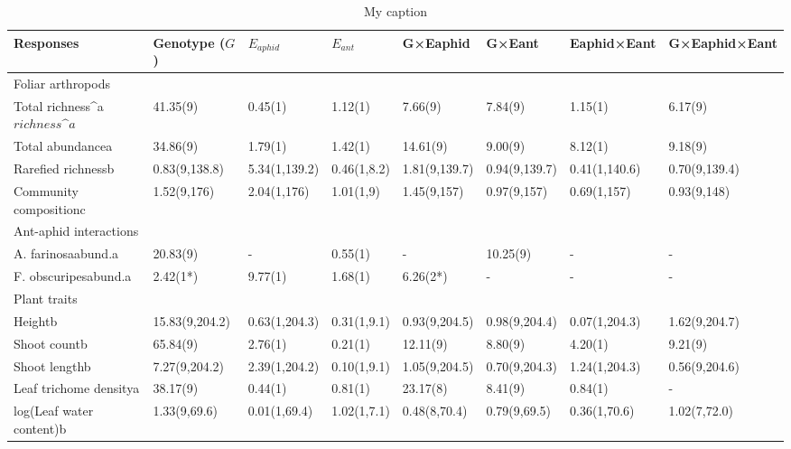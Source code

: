 \begin{table}[]
\centering
\caption{My caption}
\label{my-label}
\begin{tabular}{@{}llllllll@{}}
\toprule
Responses                & Genotype (\(G\))   & \(E_{aphid}\)        &  \(E_{ant}\)        & G×Eaphid      & G×Eant        & Eaphid×Eant   & G×Eaphid×Eant \\ \midrule
Foliar arthropods        &                &               &             &               &               &               &               \\
Total richness^a\(richness\^a\)         & 41.35(9)       & 0.45(1)       & 1.12(1)     & 7.66(9)       & 7.84(9)       & 1.15(1)       & 6.17(9)       \\
Total abundancea         & 34.86(9)       & 1.79(1)       & 1.42(1)     & 14.61(9)      & 9.00(9)       & 8.12(1)       & 9.18(9)       \\
Rarefied richnessb       & 0.83(9,138.8)  & 5.34(1,139.2) & 0.46(1,8.2) & 1.81(9,139.7) & 0.94(9,139.7) & 0.41(1,140.6) & 0.70(9,139.4) \\
Community compositionc   & 1.52(9,176)    & 2.04(1,176)   & 1.01(1,9)   & 1.45(9,157)   & 0.97(9,157)   & 0.69(1,157)   & 0.93(9,148)   \\
Ant-aphid interactions   &                &               &             &               &               &               &               \\
A. farinosaabund.a       & 20.83(9)       & -             & 0.55(1)     & -             & 10.25(9)      & -             & -             \\
F. obscuripesabund.a     & 2.42(1*)       & 9.77(1)       & 1.68(1)     & 6.26(2*)      & -             & -             & -             \\
Plant traits             &                &               &             &               &               &               &               \\
Heightb                  & 15.83(9,204.2) & 0.63(1,204.3) & 0.31(1,9.1) & 0.93(9,204.5) & 0.98(9,204.4) & 0.07(1,204.3) & 1.62(9,204.7) \\
Shoot countb             & 65.84(9)       & 2.76(1)       & 0.21(1)     & 12.11(9)      & 8.80(9)       & 4.20(1)       & 9.21(9)       \\
Shoot lengthb            & 7.27(9,204.2)  & 2.39(1,204.2) & 0.10(1,9.1) & 1.05(9,204.5) & 0.70(9,204.3) & 1.24(1,204.3) & 0.56(9,204.6) \\
Leaf trichome densitya   & 38.17(9)       & 0.44(1)       & 0.81(1)     & 23.17(8)      & 8.41(9)       & 0.84(1)       & -             \\
log(Leaf water content)b & 1.33(9,69.6)   & 0.01(1,69.4)  & 1.02(1,7.1) & 0.48(8,70.4)  & 0.79(9,69.5)  & 0.36(1,70.6)  & 1.02(7,72.0)  \\ \bottomrule
\end{tabular}
\end{table}